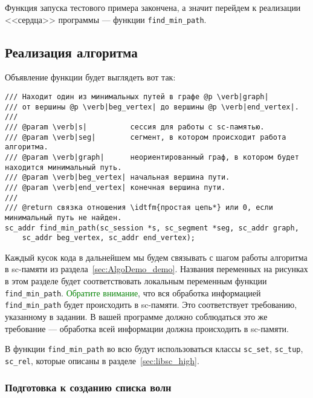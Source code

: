 Функция запуска тестового примера закончена, а значит перейдем к
реализации <<сердца>> программы --- функции \lstinline|find_min_path|.

\subsection{Реализация алгоритма}
\label{sec:libscprg_find_min_path}

Объявление функции будет выглядеть вот так:
\begin{lstlisting}[texcl]
/// Находит один из минимальных путей в графе @p \verb|graph|
/// от вершины @p \verb|beg_vertex| до вершины @p \verb|end_vertex|.
///
/// @param \verb|s|          сессия для работы с sc-памятью.
/// @param \verb|seg|        сегмент, в котором происходит работа алгоритма.
/// @param \verb|graph|      неориентированный граф, в котором будет находится минимальный путь.
/// @param \verb|beg_vertex| начальная вершина пути.
/// @param \verb|end_vertex| конечная вершина пути.
///
/// @return связка отношения \idtfm{простая цепь*} или 0, если минимальный путь не найден.
sc_addr find_min_path(sc_session *s, sc_segment *seg, sc_addr graph,
    sc_addr beg_vertex, sc_addr end_vertex);
\end{lstlisting}

Каждый кусок кода в дальнейшем мы будем связывать с шагом работы
алгоритма в sc-памяти из раздела~\ref{sec:AlgoDemo_demo}. Названия
переменных на рисунках в этом разделе будет соответствовать локальным
переменным функции
\lstinline|find_min_path|. \textcolor{green}{Обратите внимание}, что
вся обработка информацией \lstinline|find_min_path| будет происходить
в sc-памяти. Это соответствует требованию, указанному в задании. В
вашей программе должно соблюдаться это же требование --- обработка
всей информации должна происходить в sc-памяти.

В функции \lstinline|find_min_path| во всю будут использоваться классы
\lstinline|sc_set|, \lstinline|sc_tup|, \lstinline|sc_rel|, которые
описаны в разделе~\ref{sec:libsc_high}.

\subsubsection{Подготовка к созданию списка волн}
\label{sec:libscprg_fmp_before_waves_list}

